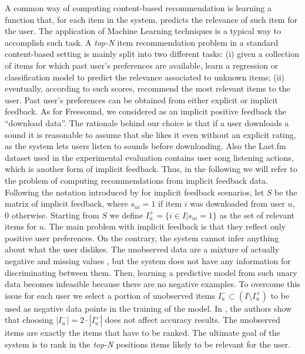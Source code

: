A common way of computing content-based recommendation is learning a function that, for each item in the system, predicts the relevance of such item for the user. 
The application of Machine Learning techniques is a typical way to accomplish such task. %
A \textit{top-N}\xspace item recommendation problem in a standard content-based setting is mainly split into two different tasks: 
(i) given a collection of items for which past user's preferences are available, learn a regression or classification model to predict the relevance associated to unknown items; (ii) eventually, according to such scores, recommend the most relevant items to the user. 
Past user's preferences can be obtained from either explicit or implicit feedback. As for Freesound, we considered as an implicit positive feedback the ``download data''. The rationale behind our choice is that if a user downloads a sound it is reasonable to assume that she likes it even without an explicit rating, as the system lets users listen to sounds before downloading. Also the Last.fm dataset used in the experimental evaluation contains user song listening actions, which is another form of implicit feedback. 
Thus, in the following we will refer to the problem of computing recommendations from implicit feedback data. 
Following the notation introduced by \cite{RendleFGS09} for implicit feedback scenarios, let $S$  be the matrix of implicit feedback, where $s_{ui}=1$ if item $i$ was downloaded from user $u$, 0 otherwise. 
Starting from $S$ we define $I_u^+ = \lbrace i \in I |  s_{ui}=1\rbrace$ as the set of relevant items for $u$. 
The main problem with implicit feedback is that they reflect only positive user preferences. On the contrary, the system cannot infer anything about what the user dislikes. The unobserved data are a mixture of actually negative and missing values \cite{RendleFGS09}, but the system does not have any information for discriminating between them. 
Then, learning a predictive model from such unary data becomes infeasible because there are no negative examples. To overcome this issue for each user we select a portion of unobserved items $I_u^- \subset (I \setminus I_u^+)$ to be used as negative data points in the training of the model. In \cite{Ostuni2013}, the authors show that choosing $|I_u^-| = 2\cdot |I_u^+|$ does not affect accuracy results.
The unobserved items are exactly the items that have to be ranked. The ultimate goal of the system is to rank in the \textit{top-N}\xspace positions items likely to be relevant for the user. 

